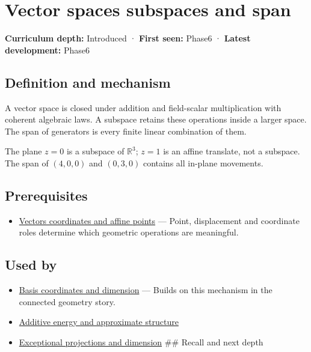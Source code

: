 \hypertarget{appendix-173b52c063ae}{}\label{referencestart:appendix-173b52c063ae}
\section{Vector spaces subspaces and span}\label{appendix-173b52c063ae-vector-spaces-subspaces-and-span}

\textbf{Curriculum depth:} Introduced · \textbf{First seen:} Phase6 · \textbf{Latest development:} Phase6

\subsection{Definition and mechanism}\label{appendix-173b52c063ae-definition-and-mechanism}

A vector space is closed under addition and field-scalar multiplication with coherent algebraic laws. A subspace retains these operations inside a larger space. The span of generators is every finite linear combination of them.

The plane \(z=0\) is a subspace of \(\mathbb R^3\); \(z=1\) is an affine translate, not a subspace. The span of \((4,0,0)\) and \((0,3,0)\) contains all in-plane movements.

\subsection{Prerequisites}\label{appendix-173b52c063ae-prerequisites}

\begin{itemize}
\tightlist
\item
  \hyperref[appendix-0659864c0aa3]{Vectors coordinates and affine points} --- Point, displacement and coordinate roles determine which geometric operations are meaningful.
\end{itemize}

\subsection{Used by}\label{appendix-173b52c063ae-used-by}

\begin{itemize}
\item
  \hyperref[appendix-ce0341f7ea0d]{Basis coordinates and dimension} --- Builds on this mechanism in the connected geometry story.
\item
  \hyperref[appendix-b0732b22e7d6]{Additive energy and approximate structure}
\item
  \hyperref[appendix-3c73f7862157]{Exceptional projections and dimension} \#\# Recall and next depth
\end{itemize}

